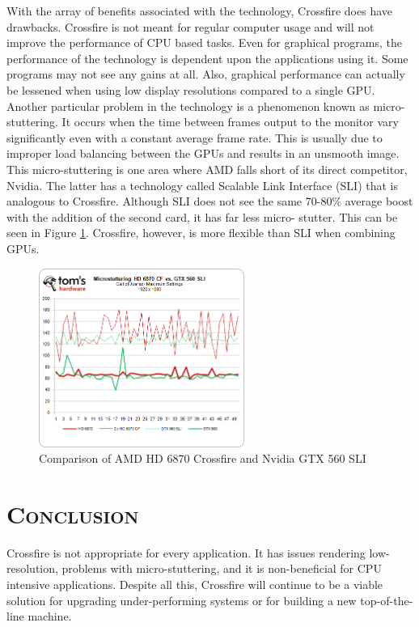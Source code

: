 \documentclass[11pt]{report}
\begin{document}
\begin{spacing}{1.5}
With the array of benefits associated with the technology, Crossfire does have drawbacks. 
Crossfire is not meant for regular computer usage and will not improve the performance of CPU based 
tasks. Even for graphical programs, the performance of the technology is dependent upon the 
applications using it. Some programs may not see any gains at all. Also, graphical performance can 
actually be lessened when using low display resolutions compared to a single GPU. Another particular 
problem in the technology is a phenomenon known as micro-stuttering. It occurs when the time 
between frames output to the monitor vary significantly even with a constant average frame rate. This is 
usually due to improper load balancing between the GPUs and results in an unsmooth image. 
This micro-stuttering is one area where AMD falls short of its direct competitor, Nvidia. The 
latter has a technology called Scalable Link Interface (SLI) that is analogous to Crossfire. Although SLI 
does not see the same 70-80\% average boost with the addition of the second card, it has far less micro-
stutter. This can be seen in Figure \ref{fig:thw}. Crossfire, however, is more flexible than SLI when combining GPUs.

\vspace{30px}
\begin{figure}[H]
    \centering
    \includegraphics[width=0.6\textwidth]{fig1.png}
    \caption{Comparison of AMD HD 6870 Crossfire and Nvidia GTX 560 SLI}
    \label{fig:thw}
\end{figure}

\section*{\scshape Conclusion}

Crossfire is not appropriate for every application.  It has issues rendering low-resolution, problems with micro-stuttering,
and it is non-beneficial for CPU intensive applications.  Despite all this, Crossfire will continue to be a viable
solution for upgrading under-performing systems or for building a new top-of-the-line machine.


\end{spacing}
\end{document}
